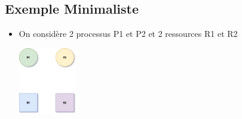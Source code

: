 \documentclass[10pt,firamath,cours]{nsi}
\begin{document}
\subsection{Exemple Minimaliste}
\begin{itemize}

\item On considère 2 processus P1 et P2 et 2 ressources R1 et R2 \begin{center}\includegraphics[width=0.2\textwidth]{img/inter1}\end{center}


\end{itemize}
\end{document}
